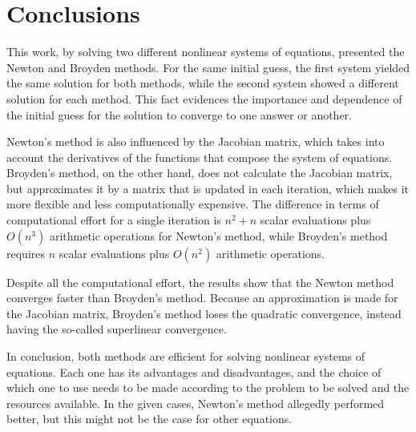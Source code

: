 \section{Conclusions} \label{sec:conclusions}
This work, by solving two different nonlinear systems of equations, presented the Newton and Broyden methods. For the same initial guess, the first system yielded the same solution for both methods, while the second system showed a different solution for each method. This fact evidences the importance and dependence of the initial guess for the solution to converge to one answer or another. 

Newton's method is also influenced by the Jacobian matrix, which takes into account the derivatives of the functions that compose the system of equations. Broyden's method, on the other hand, does not calculate the Jacobian matrix, but approximates it by a matrix that is updated in each iteration, which makes it more flexible and less computationally expensive. The difference in terms of computational effort for a single iteration is $n^2 + n$ scalar evaluations plus $O(n^3)$ arithmetic operations for Newton's method, while Broyden's method requires $n$ scalar evaluations plus $O(n^2)$ arithmetic operations.

Despite all the computational effort, the results show that the Newton method converges faster than Broyden's method. Because an approximation is made for the Jacobian matrix, Broyden's method loses the quadratic convergence, instead having the so-called superlinear convergence. 

In conclusion, both methods are efficient for solving nonlinear systems of equations. Each one has its advantages and disadvantages, and the choice of which one to use needs to be made according to the problem to be solved and the resources available. In the given cases, Newton's method allegedly performed better, but this might not be the case for other equations.